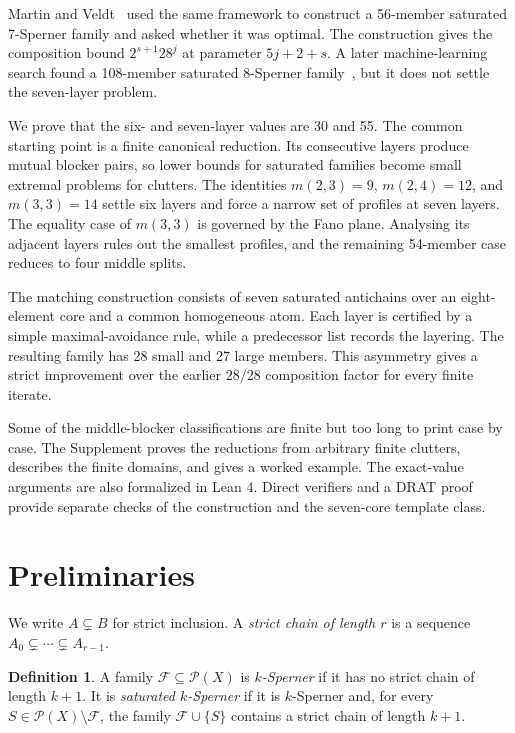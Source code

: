 \documentclass[11pt]{article}
\theoremstyle{definition}
\newtheorem{definition}[theorem]{Definition}
\theoremstyle{remark}
\newcommand{\powerset}{\mathcal{P}}
\newcommand{\family}{\mathcal{F}}
\begin{document}
Martin and Veldt~\cite{martinveldt2025} used the same framework to construct a
56-member saturated 7-Sperner family and asked whether it was optimal.  The
construction gives the composition bound $2^{s+1}28^j$ at parameter
$5j+2+s$.  A later machine-learning search found a 108-member saturated
8-Sperner family~\cite{patternboost}, but it does not settle the seven-layer
problem.

We prove that the six- and seven-layer values are 30 and 55.  The common
starting point is a finite canonical reduction.  Its consecutive layers
produce mutual blocker pairs, so lower bounds for saturated families become
small extremal problems for clutters.  The identities
$m(2,3)=9$, $m(2,4)=12$, and $m(3,3)=14$ settle six layers and force a narrow
set of profiles at seven layers.  The equality case of $m(3,3)$ is governed
by the Fano plane.  Analysing its adjacent layers rules out the smallest
profiles, and the remaining 54-member case reduces to four middle splits.

The matching construction consists of seven saturated antichains over an
eight-element core and a common homogeneous atom.  Each layer is certified by
a simple maximal-avoidance rule, while a predecessor list records the
layering.  The resulting family has 28 small and 27 large members.  This
asymmetry gives a strict improvement over the earlier $28/28$ composition
factor for every finite iterate.

Some of the middle-blocker classifications are finite but too long to print
case by case.  The Supplement proves the reductions from arbitrary finite
clutters, describes the finite domains, and gives a worked example.  The
exact-value arguments are also formalized in Lean 4.  Direct verifiers and a
DRAT proof provide separate checks of the construction and the seven-core
template class.

\section{Preliminaries}
\label{sec:preliminaries}

We write $A\subsetneq B$ for strict inclusion.  A \emph{strict chain of
length $r$} is a sequence $A_0\subsetneq\cdots\subsetneq A_{r-1}$.

\begin{definition}
A family $\family\subseteq\powerset(X)$ is \emph{$k$-Sperner} if it has no
strict chain of length $k+1$.  It is \emph{saturated $k$-Sperner} if it is
$k$-Sperner and, for every $S\in\powerset(X)\setminus\family$, the family
$\family\cup\{S\}$ contains a strict chain of length $k+1$.
\end{definition}
\end{document}
